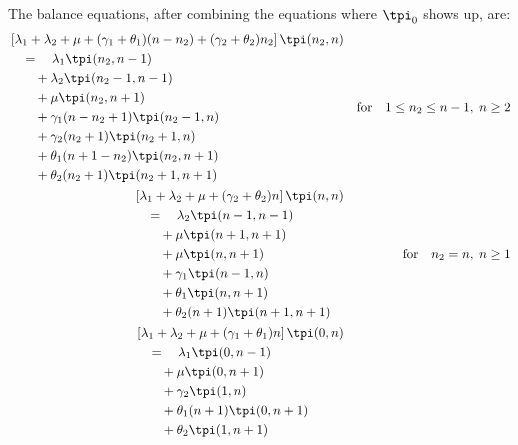 The balance equations, after combining the equations where $\tpi_0$ shows up, are:
\begin{align}
    \begin{split}
        & \left[ \lambda_1 + \lambda_2 + \mu + (\gamma_1+\theta_1)(n-n_2) + (\gamma_2+\theta_2) n_2 \right] \tpi(n_2,n) \\
        & \quad = \quad \lambda_1 \tpi(n_2,n-1) \\
        & \quad \quad + \lambda_2 \tpi(n_2-1,n-1) \\
        & \quad \quad + \mu \tpi(n_2, n+1) \\
        & \quad \quad + \gamma_1 (n-n_2+1) \tpi(n_2-1, n) \\
        & \quad \quad + \gamma_2 (n_2+1) \tpi(n_2+1,n) \\
        & \quad \quad + \theta_1 (n+1-n_2) \tpi(n_2, n+1) \\
        & \quad \quad + \theta_2 (n_2+1) \tpi(n_2+1, n+1)
    \end{split}
    && \text{for} \quad 1 \leq n_2 \leq n-1, \; n \geq 2 \label{eq:gen:tilde_balance_interior} \\
    \begin{split}
        & \left[ \lambda_1 + \lambda_2 + \mu + (\gamma_2+\theta_2) n \right] \tpi(n,n) \\
        & \quad = \quad \lambda_2 \tpi(n-1,n-1) \\
        & \quad \quad + \mu \tpi(n+1,n+1) \\
        & \quad \quad + \mu \tpi(n,n+1) \\
        & \quad \quad + \gamma_1 \tpi(n-1, n) \\
        & \quad \quad + \theta_1 \tpi(n, n+1) \\
        & \quad \quad + \theta_2 (n+1) \tpi(n+1, n+1)
    \end{split}
    && \text{for} \quad n_2=n, \; n \geq 1 \label{eq:gen:tilde_balance_diagonal} \\
    \begin{split}
        & \left[ \lambda_1 + \lambda_2 + \mu + (\gamma_1+\theta_1) n \right] \tpi(0,n) \\
        & \quad = \quad \lambda_1 \tpi(0,n-1) \\
        & \quad \quad + \mu \tpi(0, n+1) \\
        & \quad \quad + \gamma_2 \tpi(1,n) \\
        & \quad \quad + \theta_1 (n+1) \tpi(0, n+1) \\
        & \quad \quad + \theta_2 \tpi(1, n+1)

\end{split}
\end{align}
